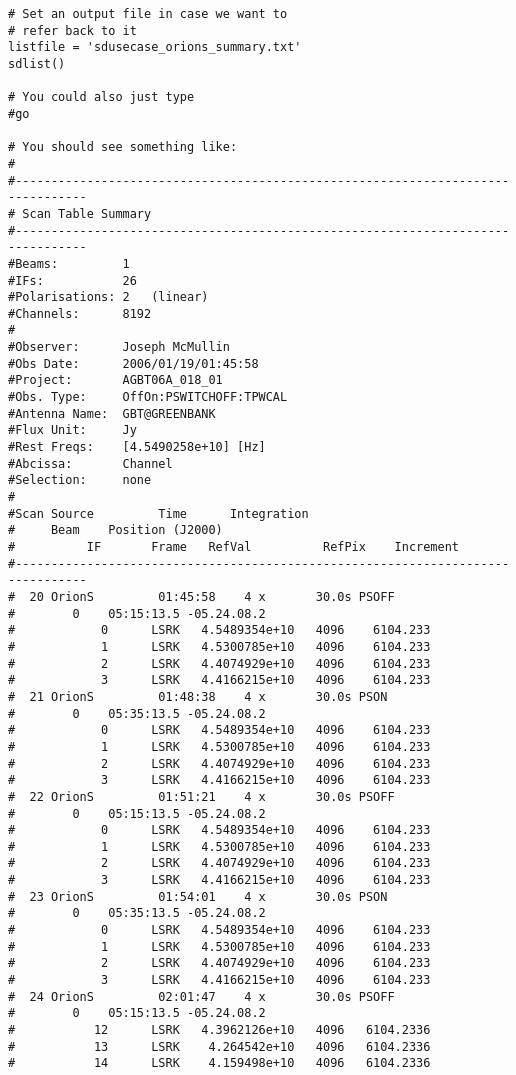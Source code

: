 \begin{verbatim}
# Set an output file in case we want to
# refer back to it
listfile = 'sdusecase_orions_summary.txt'
sdlist()

# You could also just type
#go

# You should see something like:
#
#--------------------------------------------------------------------------------
# Scan Table Summary
#--------------------------------------------------------------------------------
#Beams:         1   
#IFs:           26  
#Polarisations: 2   (linear)
#Channels:      8192
#
#Observer:      Joseph McMullin
#Obs Date:      2006/01/19/01:45:58
#Project:       AGBT06A_018_01
#Obs. Type:     OffOn:PSWITCHOFF:TPWCAL
#Antenna Name:  GBT@GREENBANK
#Flux Unit:     Jy
#Rest Freqs:    [4.5490258e+10] [Hz]
#Abcissa:       Channel
#Selection:     none
#
#Scan Source         Time      Integration       
#     Beam    Position (J2000)
#          IF       Frame   RefVal          RefPix    Increment   
#--------------------------------------------------------------------------------
#  20 OrionS         01:45:58    4 x       30.0s PSOFF
#        0    05:15:13.5 -05.24.08.2
#            0      LSRK   4.5489354e+10   4096    6104.233
#            1      LSRK   4.5300785e+10   4096    6104.233
#            2      LSRK   4.4074929e+10   4096    6104.233
#            3      LSRK   4.4166215e+10   4096    6104.233
#  21 OrionS         01:48:38    4 x       30.0s PSON
#        0    05:35:13.5 -05.24.08.2
#            0      LSRK   4.5489354e+10   4096    6104.233
#            1      LSRK   4.5300785e+10   4096    6104.233
#            2      LSRK   4.4074929e+10   4096    6104.233
#            3      LSRK   4.4166215e+10   4096    6104.233
#  22 OrionS         01:51:21    4 x       30.0s PSOFF
#        0    05:15:13.5 -05.24.08.2
#            0      LSRK   4.5489354e+10   4096    6104.233
#            1      LSRK   4.5300785e+10   4096    6104.233
#            2      LSRK   4.4074929e+10   4096    6104.233
#            3      LSRK   4.4166215e+10   4096    6104.233
#  23 OrionS         01:54:01    4 x       30.0s PSON
#        0    05:35:13.5 -05.24.08.2
#            0      LSRK   4.5489354e+10   4096    6104.233
#            1      LSRK   4.5300785e+10   4096    6104.233
#            2      LSRK   4.4074929e+10   4096    6104.233
#            3      LSRK   4.4166215e+10   4096    6104.233
#  24 OrionS         02:01:47    4 x       30.0s PSOFF
#        0    05:15:13.5 -05.24.08.2
#           12      LSRK   4.3962126e+10   4096   6104.2336
#           13      LSRK    4.264542e+10   4096   6104.2336
#           14      LSRK    4.159498e+10   4096   6104.2336

\end{verbatim}
